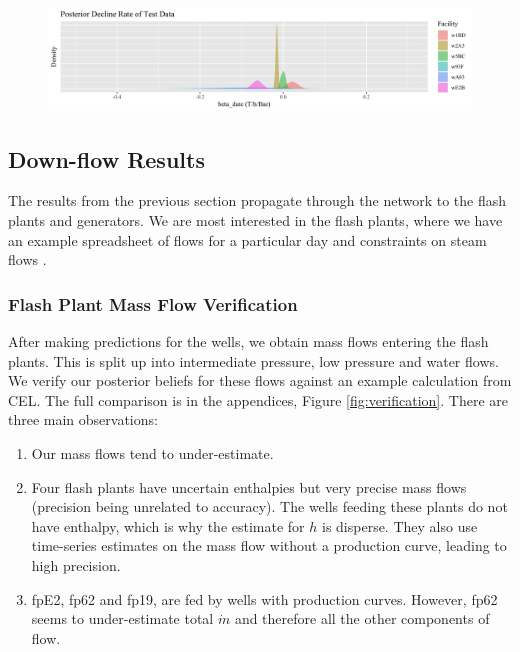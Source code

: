 \documentclass[a4paper, 12pt]{article}
\begin{document}
\begin{figure}
  \centering
  \includegraphics[width=\linewidth]{media/beta_date}
  \label{fig:beta_date}
\end{figure}

\subsection{Down-flow Results} \label{sec:downflow}
The results from the previous section propagate through the network to the flash plants and generators. We are most interested in the flash plants, where we have an example spreadsheet of flows for a particular day and constraints on steam flows .

\subsubsection{Flash Plant Mass Flow Verification}

After making predictions for the wells, we obtain mass flows entering the flash plants. This is split up into intermediate pressure, low pressure and water flows. We verify our posterior beliefs for these flows against an example calculation from CEL. The full comparison is in the appendices, Figure \ref{fig:verification}. There are three main observations:

\begin{enumerate}
\item Our mass flows tend to under-estimate.
\item Four flash plants have uncertain enthalpies but very precise mass flows (precision being unrelated to accuracy). The wells feeding these plants do not have enthalpy, which is why the estimate for $h$ is disperse. They also use time-series estimates on the mass flow without a production curve, leading to high precision.
\item fpE2, fp62 and fp19, are fed by wells with production curves. However, fp62 seems to under-estimate total $\dot{m}$ and therefore all the other components of flow.
\end{enumerate}
\end{document}
